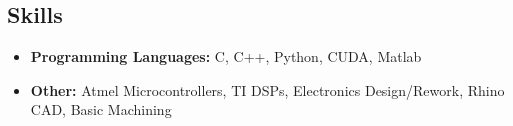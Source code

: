 \documentclass[line]{res}
\def\cal{University of California at Berkeley}
\def\spaceline{\vspace{1mm} \fullline}
\begin{document}
\begin{resume}
 

 \vspace{-3mm}
 \section{Skills}
 \begin{itemize}
\item 
 \spaceline
{\bf Programming Languages: } C, C++, Python, CUDA, Matlab
\item {\bf Other: } Atmel Microcontrollers, TI DSPs, Electronics Design/Rework, Rhino CAD, Basic Machining
\end{itemize}



\end{resume}
\end{document}
